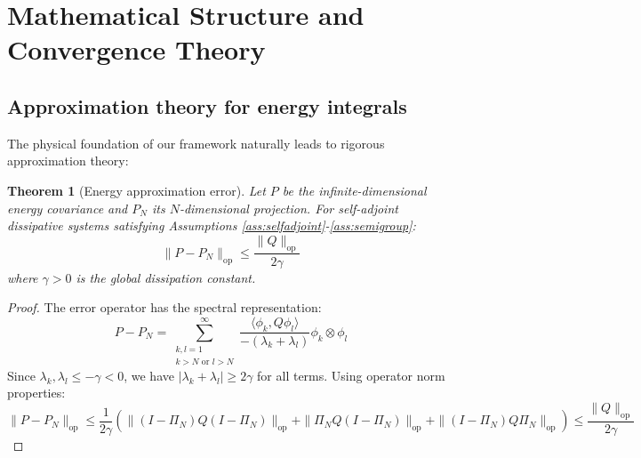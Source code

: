 \documentclass[a4paper,12pt]{article}
\newtheorem{theorem}{Theorem}[section]
\newcommand{\inner}[2]{\langle #1, #2 \rangle}
\newcommand{\op}{\text{op}}
\begin{document}
\section{Mathematical Structure and Convergence Theory}\label{sec:convergence}

\subsection{Approximation theory for energy integrals}

The physical foundation of our framework naturally leads to rigorous approximation theory:

\begin{theorem}[Energy approximation error]\label{thm:energy_error}
Let $P$ be the infinite-dimensional energy covariance and $P_N$ its $N$-dimensional projection. For self-adjoint dissipative systems satisfying Assumptions \ref{ass:selfadjoint}-\ref{ass:semigroup}:
\begin{equation}
\|P - P_N\|_{\op} \leq \frac{\|Q\|_{\op}}{2\gamma}
\end{equation}
where $\gamma > 0$ is the global dissipation constant.
\end{theorem}

\begin{proof}
The error operator has the spectral representation:
\begin{equation}
P - P_N = \sum_{\substack{k,l=1 \\ k>N \text{ or } l>N}}^{\infty} \frac{\inner{\phi_k}{Q\phi_l}}{-(\lambda_k + \lambda_l)} \phi_k \otimes \phi_l
\end{equation}
Since $\lambda_k, \lambda_l \leq -\gamma < 0$, we have $|\lambda_k + \lambda_l| \geq 2\gamma$ for all terms. Using operator norm properties:
\begin{equation}
\|P - P_N\|_{\op} \leq \frac{1}{2\gamma}\left(\|(I-\Pi_N)Q(I-\Pi_N)\|_{\op} + \|\Pi_N Q(I-\Pi_N)\|_{\op} + \|(I-\Pi_N)Q\Pi_N\|_{\op}\right) \leq \frac{\|Q\|_{\op}}{2\gamma}
\end{equation}
\end{proof}
\end{document}
